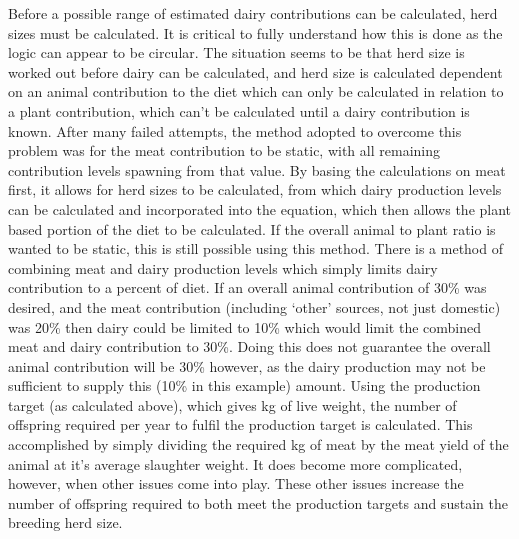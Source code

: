 Before a possible range of estimated dairy contributions can be calculated, herd sizes must be calculated.  It is critical to fully understand how this is done as the logic can appear to be circular.  
The situation seems to be that herd size is worked out before dairy can be calculated, and herd size is calculated dependent on an animal contribution to the diet which can only be calculated in relation to a plant contribution, which can't be calculated until a dairy contribution is known.  
After many failed attempts, the method adopted to overcome this problem was for the meat contribution to be static, with all remaining contribution levels spawning from that value.  By basing the calculations on meat first, it allows for herd sizes to be calculated, from which dairy production levels can be calculated and incorporated into the equation, which then allows the plant based portion of the diet to be calculated.  If the overall animal to plant ratio is wanted to be static, this is still possible using this method. 
There is a method of combining meat and dairy production levels which simply limits dairy contribution to a percent of diet.  If an overall animal contribution of 30\% was desired, and the meat contribution (including `other' sources, not just domestic) was 20\% then dairy could be limited to 10\% which would limit the combined meat and dairy contribution to 30\%.  Doing this does not guarantee the overall animal contribution will be 30\% however, as the dairy production may not be sufficient to supply this (10\% in this example) amount.   
Using the production target (as calculated above), which gives kg of live weight, the number of offspring required per year to fulfil the production target is calculated.  This accomplished by simply dividing the required kg of meat by the meat yield of the animal at it's average slaughter weight.  
It does become more complicated, however, when other issues come into play. These other issues increase the number of offspring required to both meet the production targets and sustain the breeding herd size.

